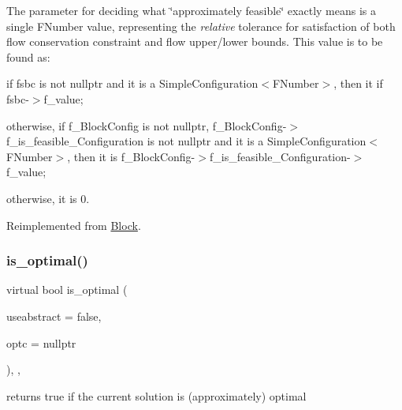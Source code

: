 The parameter for deciding what \char`\"{}approximately feasible\char`\"{} exactly means is a single F\+Number value, representing the {\itshape relative} tolerance for satisfaction of both flow conservation constraint and flow upper/lower bounds. This value is to be found as\+:


\begin{DoxyItemize}
\item if fsbc is not nullptr and it is a Simple\+Configuration$<$\+F\+Number$>$, then it if fsbc-\/$>$f\+\_\+value;
\item otherwise, if f\+\_\+\+Block\+Config is not nullptr, f\+\_\+\+Block\+Config-\/$>$f\+\_\+is\+\_\+feasible\+\_\+\+Configuration is not nullptr and it is a Simple\+Configuration$<$\+F\+Number$>$, then it is f\+\_\+\+Block\+Config-\/$>$f\+\_\+is\+\_\+feasible\+\_\+\+Configuration-\/$>$f\+\_\+value;
\item otherwise, it is 0. 
\end{DoxyItemize}

Reimplemented from \mbox{\hyperlink{class_s_m_spp__di__unipi__it_1_1_block_a4204ffb542117f4ea97eeceeda4da079}{Block}}.

\mbox{\label{class_s_m_spp__di__unipi__it_1_1_m_c_f_block_a0b1e7ff87a97e692c97f52f096f6eb50}} 
\subsubsection{\texorpdfstring{is\+\_\+optimal()}{is\_optimal()}}
{\footnotesize\ttfamily virtual bool is\+\_\+optimal (\begin{DoxyParamCaption}\item[{bool}]{useabstract = {\ttfamily false},  }\item[{\mbox{\hyperlink{class_s_m_spp__di__unipi__it_1_1_configuration}{Configuration}} $\ast$}]{optc = {\ttfamily nullptr} }\end{DoxyParamCaption})\hspace{0.3cm}{\ttfamily [final]}, {\ttfamily [override]}, {\ttfamily [virtual]}}



returns true if the current solution is (approximately) optimal 

